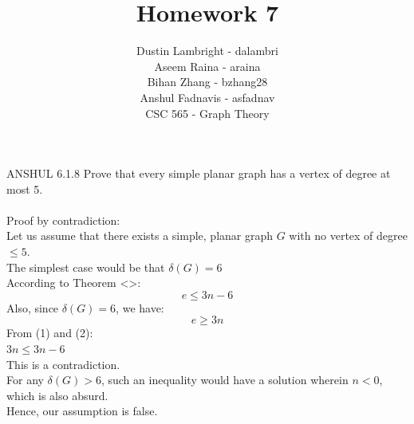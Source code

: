 \documentclass[12pt]{article}
\newenvironment{question}[2][Question]{\begin{trivlist}
\item[\hskip \labelsep {\bfseries #1}\hskip \labelsep {\bfseries #2.}]}{\end{trivlist}}
\begin{document}


\title{Homework 7}%
\author{Dustin Lambright - dalambri \\ Aseem Raina - araina \\ Bihan Zhang - bzhang28 \\ Anshul Fadnavis - asfadnav\\
CSC 565 - Graph Theory} %

\maketitle


\begin{question}{1} - \color{blue} ANSHUL \color{black}
6.1.8  Prove that every simple planar graph has a vertex of degree at most 5.\\
\\
Proof by contradiction:\\
Let us assume that there exists a simple, planar graph $G$ with no vertex of degree $\leq 5$.\\
The simplest case would be that $\delta(G) = 6$\\
According to Theorem <>:\\
\begin{equation}
e \leq 3n - 6
\end{equation}
Also, since $\delta(G) = 6$, we have:\\
\begin{equation}
e \geq 3n
\end{equation}
From (1) and (2):\\\indent$3n \leq 3n - 6$\\
This is a contradiction.\\
For any $\delta(G) > 6$, such an inequality would have a solution wherein  $n < 0$, which is also absurd.\\
Hence, our assumption is false.
\end{question}
\end{document}
